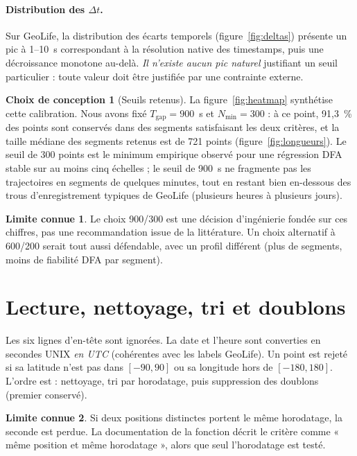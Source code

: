 \documentclass[12pt,a4paper]{report}
\theoremstyle{definition}
\newtheorem{choix}{Choix de conception}[chapter]
\newtheorem{limite}{Limite connue}[chapter]
\begin{document}
\paragraph{Distribution des $\Delta t$.} Sur GeoLife, la distribution des écarts temporels
(figure~\ref{fig:deltas}) présente un pic à 1--10~s correspondant à la résolution native
des timestamps, puis une décroissance monotone au-delà. \emph{Il n'existe aucun pic
naturel} justifiant un seuil particulier : toute valeur doit être justifiée par une
contrainte externe.

\begin{choix}[Seuils retenus]
La figure~\ref{fig:heatmap} synthétise cette calibration. Nous avons fixé
$T_{\mathrm{gap}}=900$~s et $N_{\min}=300$ : à ce point, 91,3~\% des points sont
conservés dans des segments satisfaisant les deux critères, et la taille médiane des
segments retenus est de 721 points (figure~\ref{fig:longueurs}). Le seuil de 300 points
est le minimum empirique observé pour une régression DFA stable sur au moins cinq
échelles ; le seuil de 900~s ne fragmente pas les trajectoires en segments de quelques
minutes, tout en restant bien en-dessous des trous d'enregistrement typiques de GeoLife
(plusieurs heures à plusieurs jours).
\end{choix}

\begin{limite}
Le choix 900/300 est une décision d'ingénierie fondée sur ces chiffres, pas une
recommandation issue de la littérature. Un choix alternatif à 600/200 serait tout aussi
défendable, avec un profil différent (plus de segments, moins de fiabilité DFA par
segment).
\end{limite}

\section{Lecture, nettoyage, tri et doublons}

Les six lignes d'en-tête sont ignorées. La date et l'heure sont converties en secondes
UNIX \emph{en UTC} (cohérentes avec les labels GeoLife). Un point est rejeté si sa
latitude n'est pas dans $[-90,90]$ ou sa longitude hors de $[-180,180]$. L'ordre est :
nettoyage, tri par horodatage, puis suppression des doublons (premier conservé).

\begin{limite}
Si deux positions distinctes portent le même horodatage, la seconde est perdue. La
documentation de la fonction décrit le critère comme « même position et même horodatage »,
alors que seul l'horodatage est testé.
\end{limite}
\end{document}
